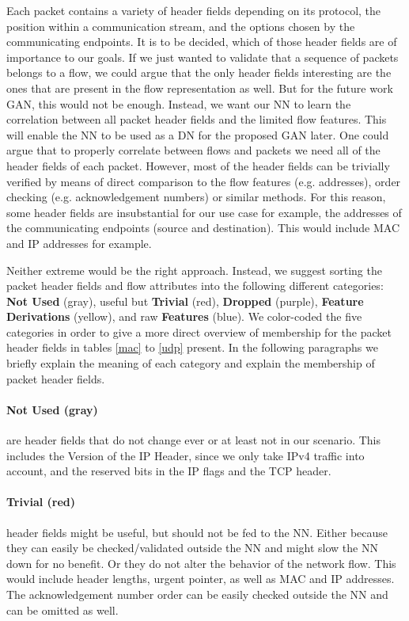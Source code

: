 \documentclass[
	ngerman,
	ruledheaders=section,%
	class=report,%
	thesis={type=bachelor},%
	accentcolor=9c,%
	custommargins=true,%
	marginpar=false,%
	parskip=half-,%
	fontsize=11pt,%
]{tudapub}
\begin{document}
Each packet contains a variety of header fields depending on its protocol, the position within a communication stream, and the options chosen by the communicating endpoints.
It is to be decided, which of those header fields are of importance to our goals.
If we just wanted to validate that a sequence of packets belongs to a flow, we could argue that the only header fields interesting are the ones that are present in the flow representation as well.
But for the future work GAN, this would not be enough.
Instead, we want our NN to learn the correlation between all packet header fields and the limited flow features.
This will enable the NN to be used as a DN for the proposed GAN later.
One could argue that to properly correlate between flows and packets we need all of the header fields of each packet.
However, most of the header fields can be trivially verified by means of direct comparison to the flow features (e.g. addresses), order checking (e.g. acknowledgement numbers) or similar methods.
For this reason, some header fields are insubstantial for our use case for example, the addresses of the communicating endpoints (source and destination).
This would include MAC and IP addresses for example.

Neither extreme would be the right approach.
Instead, we suggest sorting the packet header fields and flow attributes into the following different categories:
\colorbox{not}{\textbf{{Not Used}} (gray)},
useful but \colorbox{trivial}{\textbf{Trivial} (red)},
\colorbox{dropped}{\textbf{Dropped} (purple)},
\colorbox{derivation}{\textbf{Feature Derivations} (yellow)},
and raw \colorbox{feature}{\textbf{Features} (blue)}.
We color-coded the five categories in order to give a more direct overview of membership for the packet header fields in tables \ref{mac} to \ref{udp} present.
In the following paragraphs we briefly explain the meaning of each category and explain the membership of packet header fields.

\paragraph{\colorbox{not}{\textbf{{Not Used} (gray)}}} are header fields that do not change ever or at least not in our scenario.
This includes the Version of the IP Header, since we only take IPv4 traffic into account,
and the reserved bits in the IP flags and the TCP header.

\paragraph{\colorbox{trivial}{\textbf{Trivial} (red)}} header fields might be useful, but should not be fed to the NN.
Either because they can easily be checked/validated outside the NN and might slow the NN down for no benefit.
Or they do not alter the behavior of the network flow.
This would include header lengths, urgent pointer, as well as MAC and IP addresses.
The acknowledgement number order can be easily checked outside the NN and can be omitted as well.
\end{document}
